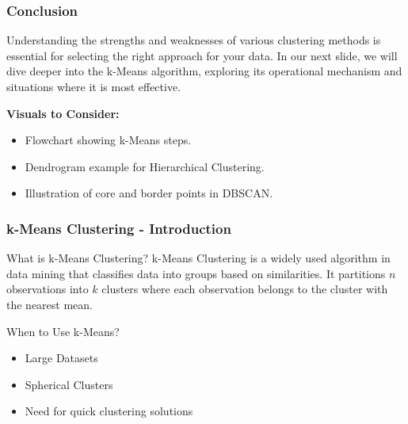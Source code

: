 \documentclass[aspectratio=169]{beamer}
\begin{document}
\begin{frame}[fragile]
    \frametitle{Conclusion}
    Understanding the strengths and weaknesses of various clustering methods is essential for selecting the right approach for your data. 
    In our next slide, we will dive deeper into the k-Means algorithm, exploring its operational mechanism and situations where it is most effective.
    
    \textbf{Visuals to Consider:}
    \begin{itemize}
        \item Flowchart showing k-Means steps.
        \item Dendrogram example for Hierarchical Clustering.
        \item Illustration of core and border points in DBSCAN.
    \end{itemize}
\end{frame}

\begin{frame}[fragile]
    \frametitle{k-Means Clustering - Introduction}
    
    \begin{block}{What is k-Means Clustering?}
        k-Means Clustering is a widely used algorithm in data mining that classifies data into groups based on similarities. It partitions \( n \) observations into \( k \) clusters where each observation belongs to the cluster with the nearest mean.
    \end{block}
    
    \begin{block}{When to Use k-Means?}
        \begin{itemize}
            \item Large Datasets
            \item Spherical Clusters
            \item Need for quick clustering solutions
        \end{itemize}
    \end{block}
\end{frame}
\end{document}
